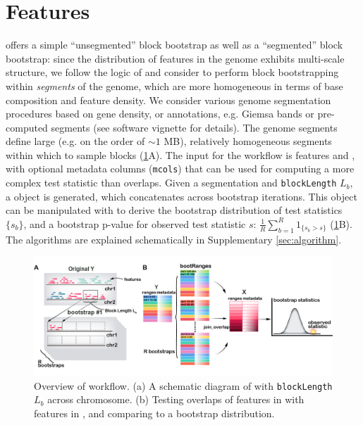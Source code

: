 \vspace*{-20pt}

\section{Features}

\bootranges offers a simple ``unsegmented'' block bootstrap as well as
a ``segmented'' block bootstrap:
since the distribution of features in the genome exhibits multi-scale
structure, we follow the logic of \citet{bickel2010subsampling} and consider to
perform block bootstrapping within \textit{segments} of the genome, which are
more homogeneous in terms of base composition and feature density.
We consider various genome segmentation procedures based on gene
density, or annotations, e.g. Giemsa bands or pre-computed segments
(see software vignette for details).
The genome segments define large (e.g. on the order of ${\sim}1$ MB),
relatively homogeneous segments within which to sample blocks
(\cref{fig:framework}A). 
The input for the workflow is \granges features  and
, with optional metadata columns (\texttt{mcols}) that can be
used for computing a more complex test statistic than overlaps.
Given a segmentation and \texttt{blockLength} $L_b$, a \bootranges
object is generated, which concatenates \granges across bootstrap
iterations. This \bootranges object can be manipulated with \plyranges
to derive the bootstrap distribution of test statistics $\{s_b\}$, and a
bootstrap p-value for observed test statistic $s$:
$ \frac{1}{R} \sum_{b=1}^R 1_{\{s_b > s\}} $ (\cref{fig:framework}B).
The \bootranges algorithms are explained schematically in Supplementary \cref{sec:algorithm}.

\vspace{-0.3cm}
\begin{figure}[htbp]
\centering%
\setlength{\abovecaptionskip}{-0.05cm}
\includegraphics[scale=0.65]{Figures/bootRanges.jpg}
\caption{Overview of \bootranges workflow. (a) A schematic
  diagram of \bootranges with \texttt{blockLength} $L_b$ across chromosome.
  (b) Testing overlaps of features in  with features in
  , and comparing to a bootstrap distribution.} 
\label{fig:framework}
\vspace{-0.5cm}
\end{figure}

